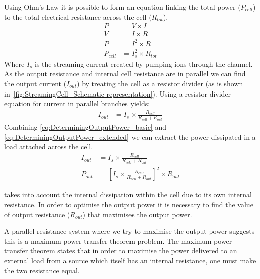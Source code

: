      Using Ohm's Law it is possible to form an equation linking the total power ($P_{cell}$) to the total electrical resistance across the cell ($R_{tot}$).
      \begin{align}
          P & = V\times I\nonumber \\
          V & = I\times R\nonumber \\
          P & = I^{2}\times R\nonumber \\
          P_{cell} & = I_{s}^{2}\times R_{tot}
          \label{eq:DeterminingOutputPower_basic}
      \end{align}
      Where $I_{s}$ is the streaming current created by pumping ions through the channel.
      As the output resistance and internal cell resistance are in parallel we can find the output current ($I_{out}$) by treating the cell as a resistor divider (as is shown in~\cref{fig:StreamingCell_Schematic-representation}).
      Using a resistor divider equation for current in parallel branches yields:
      \begin{align}
          I_{out} & = I_{s}\times\frac{R_{cell}}{R_{cell}+R_{out}}
          \label{eq:DeterminingOutputPower_extended}
      \end{align}
      Combining \cref{eq:DeterminingOutputPower_basic} and \cref{eq:DeterminingOutputPower_extended} we can extract the power dissipated in a load attached across the cell.
      \begin{align}
          I_{out} & = I_{s}\times\frac{R_{cell}}{R_{cell}+R_{out}}\nonumber \\
          P_{out} & = \left[I_{s}\times\frac{R_{cell}}{R_{cell}+R_{out}}\right]^{2}\times R_{out}
          \label{eq:DeterminingOutputPower_result}
      \end{align}

       takes into account the internal dissipation within the cell due to its own internal resistance.
      In order to optimise the output power it is necessary to find the value of output resistance ($R_{out}$) that maximises the output power.

      A parallel resistance system where we try to maximise the output power suggests this is a maximum power transfer theorem problem.
      The maximum power transfer theorem states that in order to maximise the power delivered to an external load from a source which itself has an internal resistance, one must make the two resistance equal.




